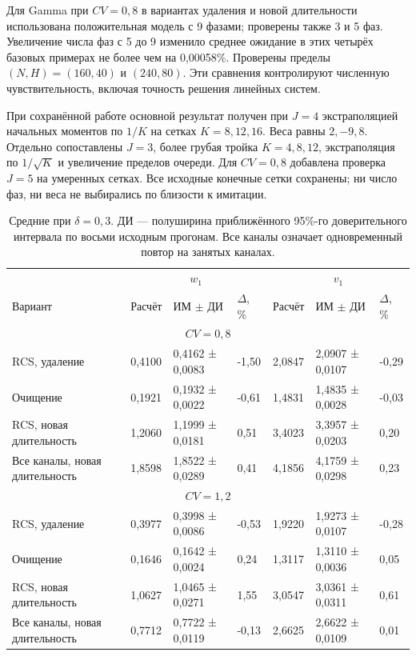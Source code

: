 \documentclass[a4paper,12pt]{article}
\begin{document}
Для Gamma при \(CV=0{,}8\) в вариантах удаления и новой длительности использована положительная модель с 9 фазами; проверены также 3 и 5 фаз. Увеличение числа фаз с 5 до 9 изменило среднее ожидание в этих четырёх базовых примерах не более чем на 0{,}00058\%. Проверены пределы \((N,H)=(160,40)\) и \((240,80)\). Эти сравнения контролируют численную чувствительность, включая точность решения линейных систем.

При сохранённой работе основной результат получен при \(J=4\) экстраполяцией начальных моментов по \(1/K\) на сетках \(K=8,12,16\). Веса равны \(2,-9,8\). Отдельно сопоставлены \(J=3\), более грубая тройка \(K=4,8,12\), экстраполяция по \(1/\sqrt K\) и увеличение пределов очереди. Для \(CV=0{,}8\) добавлена проверка \(J=5\) на умеренных сетках. Все исходные конечные сетки сохранены; ни число фаз, ни веса не выбирались по близости к имитации.

\begin{table}[!htbp]
\centering\small\setlength{\tabcolsep}{2pt}
\begin{tabular}{@{}p{4.16cm}p{1.61cm}p{2.83cm}p{1.28cm}p{1.61cm}p{2.83cm}p{1.28cm}@{}}
\toprule
 & \multicolumn{3}{c}{$w_1$} & \multicolumn{3}{c}{$v_1$} \\
Вариант & Расчёт & ИМ $\pm$ ДИ & $\Delta$, \% & Расчёт & ИМ $\pm$ ДИ & $\Delta$, \% \\
\midrule
\multicolumn{7}{c}{$CV=0,8$} \\
RCS, удаление & 0,4100 & 0,4162 ± 0,0083 & -1,50 & 2,0847 & 2,0907 ± 0,0107 & -0,29 \\
Очищение & 0,1921 & 0,1932 ± 0,0022 & -0,61 & 1,4831 & 1,4835 ± 0,0028 & -0,03 \\
RCS, новая длительность & 1,2060 & 1,1999 ± 0,0181 & 0,51 & 3,4023 & 3,3957 ± 0,0203 & 0,20 \\
Все каналы, новая длительность & 1,8598 & 1,8522 ± 0,0289 & 0,41 & 4,1856 & 4,1759 ± 0,0298 & 0,23 \\
\multicolumn{7}{c}{$CV=1,2$} \\
RCS, удаление & 0,3977 & 0,3998 ± 0,0086 & -0,53 & 1,9220 & 1,9273 ± 0,0107 & -0,28 \\
Очищение & 0,1646 & 0,1642 ± 0,0024 & 0,24 & 1,3117 & 1,3110 ± 0,0036 & 0,05 \\
RCS, новая длительность & 1,0627 & 1,0465 ± 0,0271 & 1,55 & 3,0547 & 3,0361 ± 0,0311 & 0,61 \\
Все каналы, новая длительность & 0,7712 & 0,7722 ± 0,0119 & -0,13 & 2,6625 & 2,6622 ± 0,0109 & 0,01 \\
\bottomrule
\end{tabular}
\caption{Средние при $\delta=0{,}3$. ДИ --- полуширина приближённого 95\%-го доверительного интервала по восьми исходным прогонам. Все каналы означает одновременный повтор на занятых каналах.}
\label{tab:results}
\end{table}
\end{document}
